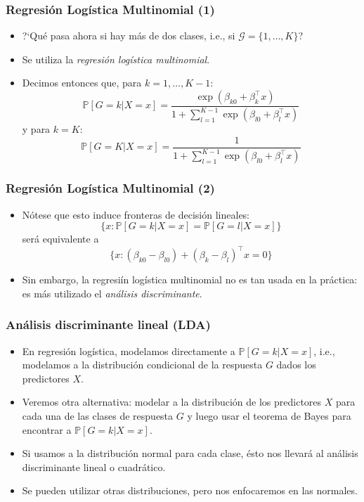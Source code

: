 \documentclass[usenames,dvipsnames]{beamer} %
\newcommand\defi[1]{\textcolor{NavyBlue}{\textit{#1}}}
\begin{document}
\begin{frame}\frametitle{Regresi\'on Log\'istica Multinomial (1)}
\begin{itemize}
	\item ?`Qu\'e pasa ahora si hay m\'as de dos clases, i.e., si $\mathcal{G}=\{1, \dotsc, K \}$?
	\item Se utiliza la \defi{regresi\'on log\'istica multinomial}.
	\item Decimos entonces que, para $k=1, \dotsc, K-1$:
	\[ \mathbb{P}[G=k|X=x] = \frac{\exp{(\beta_{k 0}+\beta_{k}^\top x)}}{1+\sum_{l=1}^{K-1}\exp{(\beta_{l 0}+\beta_{l}^\top x)}}\]
	y para $k=K$:
	\[ \mathbb{P}[G=K|X=x] = \frac{1}{1+\sum_{l=1}^{K-1}\exp{(\beta_{l 0}+\beta_{l}^\top x)}}\]
	
	
\end{itemize}
\end{frame}

\begin{frame}\frametitle{Regresi\'on Log\'istica Multinomial (2)}
\begin{itemize}
	\item N\'otese que esto induce fronteras de decisi\'on lineales: 
	\[ \{ x: \mathbb{P}[G=k|X=x] = \mathbb{P}[G=l|X=x] \}\]
	ser\'a equivalente a
	\[ \{ x: (\beta_{k0} - \beta_{l0})+(\beta_k - \beta_l)^\top x=0 \}\]
	
	\item Sin embargo, la regresi\'in log\'istica multinomial no es tan usada en la pr\'actica: es m\'as utilizado el \defi{an\'alisis discriminante}.
\end{itemize}
\end{frame}

\begin{frame}\frametitle{An\'alisis discriminante lineal (LDA)}
\begin{itemize}
	\item En regresi\'on log\'istica, modelamos directamente a $\mathbb{P}[G=k|X=x]$, i.e., modelamos a la distribuci\'on condicional de la respuesta $G$ dados los predictores $X$.
	\item Veremos otra alternativa: modelar a la distribuci\'on de los predictores $X$ para cada una de las clases de respuesta $G$ y luego usar el teorema de Bayes para encontrar a $\mathbb{P}[G=k|X=x]$.
	\item Si usamos a la distribuci\'on normal para cada clase, \'esto nos llevar\'a al an\'alisis discriminante lineal o cuadr\'atico.
	\item Se pueden utilizar otras distribuciones, pero nos enfocaremos en las normales.
\end{itemize}
\end{frame}
\end{document}
